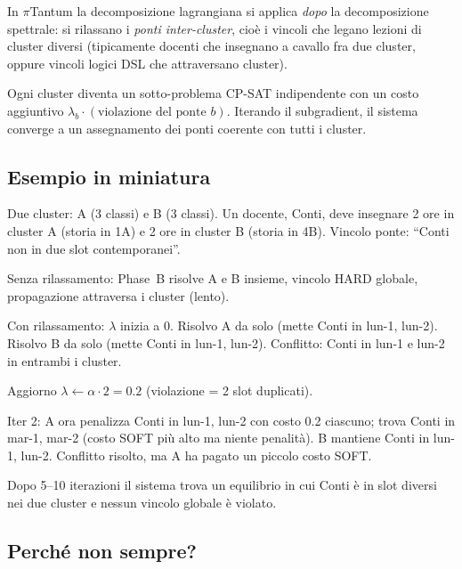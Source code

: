 In $\pi$Tantum la decomposizione lagrangiana si applica
\emph{dopo} la decomposizione spettrale: si rilassano i
\emph{ponti inter-cluster}, cio\`e
i vincoli che legano lezioni di cluster diversi (tipicamente
docenti che insegnano a cavallo fra due cluster, oppure
vincoli logici DSL che attraversano cluster).

Ogni cluster diventa un sotto-problema CP-SAT indipendente
con un costo aggiuntivo $\lambda_b \cdot (\text{violazione del
ponte } b)$. Iterando il subgradient, il sistema converge a
un assegnamento dei ponti coerente con tutti i cluster.

\subsection{Esempio in miniatura}

\begin{esempiobox}
Due cluster: A (3 classi) e B (3 classi). Un docente, Conti,
deve insegnare 2 ore in cluster A (storia in 1A) e 2 ore in
cluster B (storia in 4B). Vincolo ponte: ``Conti non in due
slot contemporanei''.

Senza rilassamento: Phase~B risolve A e B insieme, vincolo
HARD globale, propagazione attraversa i cluster (lento).

Con rilassamento: $\lambda$ inizia a 0. Risolvo A da solo
(mette Conti in lun-1, lun-2). Risolvo B da solo (mette
Conti in lun-1, lun-2). Conflitto: Conti in lun-1 e lun-2 in
entrambi i cluster.

Aggiorno $\lambda \leftarrow \alpha \cdot 2 = 0.2$
(violazione = 2 slot duplicati).

Iter 2: A ora penalizza Conti in lun-1, lun-2 con costo 0.2
ciascuno; trova Conti in mar-1, mar-2 (costo SOFT pi\`u alto
ma niente penalit\`a). B mantiene Conti in lun-1, lun-2.
Conflitto risolto, ma A ha pagato un piccolo costo SOFT.

Dopo 5--10 iterazioni il sistema trova un equilibrio in cui
Conti \`e in slot diversi nei due cluster e nessun vincolo
globale \`e violato.
\end{esempiobox}

\subsection{Perch\'e non sempre?}

